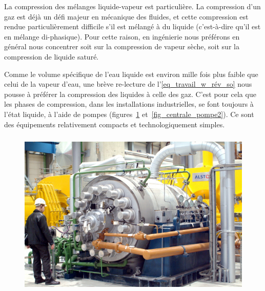 		La compression des mélanges liquide-vapeur est particulière. La compression d’un gaz est déjà un défi majeur en mécanique des fluides, et cette compression est rendue particulièrement difficile s’il est mélangé à du liquide (c’est-à-dire qu’il est en mélange di-phasique). Pour cette raison, en ingénierie nous préférons en général nous concentrer soit sur la compression de vapeur sèche, soit sur la compression de liquide saturé.

		Comme le volume spécifique de l’eau liquide est environ mille fois plus faible que celui de la vapeur d’eau, une brève re-lecture de l’\cref{eq_travail_w_rév_so} nous pousse à préférer la compression des liquides à celle des gaz. C’est pour cela que les phases de compression, dans les installations industrielles, se font toujours à l’état liquide, à l’aide de pompes (figures~\ref{fig_centrale_pompe1} et~\ref{fig_centrale_pompe2}). Ce sont des équipements relativement compacts et technologiquement simples.

		\begin{figure}
			\begin{center}
				\includegraphics[height=8cm]{images/centrale_pompe_photo.jpg}
			\end{center}
			\label{fig_centrale_pompe1}
		\end{figure}

